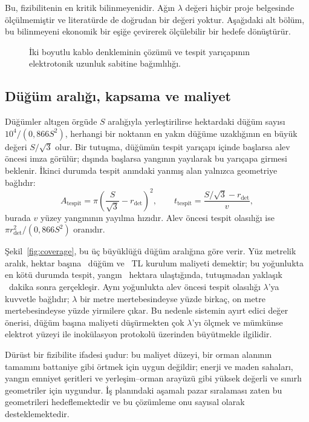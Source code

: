 \documentclass[11pt,a4paper]{article}
\begin{document}
Bu, fizibilitenin en kritik bilinmeyenidir. Ağın $\lambda$ değeri hiçbir proje
belgesinde ölçülmemiştir ve literatürde de doğrudan bir değeri yoktur.
Aşağıdaki alt bölüm, bu bilinmeyeni ekonomik bir eşiğe çevirerek ölçülebilir
bir hedefe dönüştürür.

\begin{figure}[htbp]\centering

\caption{İki boyutlu kablo denkleminin çözümü ve tespit yarıçapının
elektrotonik uzunluk sabitine bağımlılığı.}
\label{fig:cable}
\end{figure}

\subsection{Düğüm aralığı, kapsama ve maliyet}

Düğümler altıgen örgüde $S$ aralığıyla yerleştirilirse hektardaki düğüm sayısı
$10^4/(0{,}866 S^2)$, herhangi bir noktanın en yakın düğüme uzaklığının en
büyük değeri $S/\sqrt{3}$ olur. Bir tutuşma, düğümün tespit yarıçapı içinde
başlarsa alev öncesi imza görülür; dışında başlarsa yangının yayılarak bu
yarıçapa girmesi beklenir. İkinci durumda tespit anındaki yanmış alan yalnızca
geometriye bağlıdır:
\begin{equation}
A_{\mathrm{tespit}} = \pi\left(\frac{S}{\sqrt3} - r_{\mathrm{det}}\right)^{\!2},
\qquad
t_{\mathrm{tespit}} = \frac{S/\sqrt3 - r_{\mathrm{det}}}{v},
\end{equation}
burada $v$ yüzey yangınının yayılma hızıdır. Alev öncesi tespit olasılığı ise
$\pi r_{\mathrm{det}}^2/(0{,}866 S^2)$ oranıdır.

Şekil~\ref{fig:coverage}, bu üç büyüklüğü düğüm aralığına göre verir. Yüz
metrelik aralık, hektar başına \covNodes\ düğüm ve \covCapex~TL kurulum
maliyeti demektir; bu yoğunlukta en kötü durumda tespit, yangın
\covArea~hektara ulaştığında, tutuşmadan yaklaşık \covTime~dakika sonra
gerçekleşir. Aynı yoğunlukta alev öncesi tespit olasılığı $\lambda$'ya
kuvvetle bağlıdır; $\lambda$ bir metre mertebesindeyse yüzde birkaç, on metre
mertebesindeyse yüzde yirmilere çıkar. Bu nedenle sistemin ayırt edici
değer önerisi, düğüm başına maliyeti düşürmekten çok $\lambda$'yı ölçmek ve
mümkünse elektrot yüzeyi ile inokülasyon protokolü üzerinden büyütmekle
ilgilidir.

Dürüst bir fizibilite ifadesi şudur: bu maliyet düzeyi, bir orman alanının
tamamını battaniye gibi örtmek için uygun değildir; enerji ve maden sahaları,
yangın emniyet şeritleri ve yerleşim--orman arayüzü gibi yüksek değerli ve
sınırlı geometriler için uygundur. İş planındaki aşamalı pazar sıralaması
zaten bu geometrileri hedeflemektedir ve bu çözümleme onu sayısal olarak
desteklemektedir.
\end{document}
